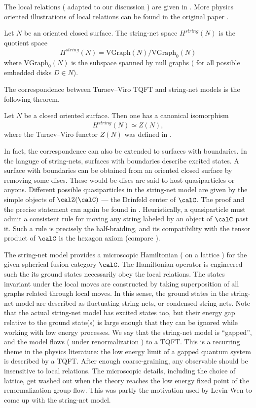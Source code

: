 The local relations ( adapted to our discussion ) are given in . More physics
oriented illustrations of local relations can be found in the original paper \cite{levin-wen}.

\begin{definition}
	Let $N$ be an oriented closed surface. The string-net space $H^{string}(N)$ is the quotient space
	\[
		H^{string}(N) = \mathrm{VGraph}(N)/\mathrm{VGraph}_0(N)
	\]
	where $\mathrm{VGraph}_0(N)$ is the subspace spanned by null graphs ( for all possible embedded 
	disks $D \in N$).
\end{definition}

The correspondence between Turaev--Viro TQFT and string-net models is the 
following theorem.

\begin{theorem}\label{t:tv-equals-stringnet}
	Let $N$ be a closed oriented surface. Then one has a canonical isomorphism
	\[
		H^{string}(N) \simeq Z(N),
	\]
	where the Turaev--Viro functor $Z(N)$ was defined in .
\end{theorem}

In fact, the correspondence can also be extended to surfaces with boundaries. 
In the languge of string-nets, surfaces with boundaries describe excited states. 
A surface with boundaries can be obtained from an oriented closed surface
by removing some discs. These would-be-discs are said to host quasiparticles 
or anyons. Different possible quasiparticles in the string-net model are given 
by the simple objects of $\calZ(\calC)$ --- the Drinfeld center of $\calC$. 
The proof and the precise statement can again be found in \cite{kirillov-stringnet}.
Heuristically, a quasiparticle must admit a consistent rule for moving any string labeled
by an object of $\calC$ past it. Such a rule is precisely the half-braiding, and its
compatibility with the tensor product of $\calC$ is the hexagon axiom 
(compare ).

The string-net model provides a microscopic Hamiltonian ( on a lattice ) for the given
spherical fusion category $\calC$. The 
Hamiltonian operator is engineered such the its
ground states necessarily obey the local relations. The states invariant under
the local moves are constructed by taking superposition of all graphs
related through local moves. In this sense, the ground states in the string-net model are
described as fluctuating string-nets, or condensed string-nets. Note that the actual 
string-net model has excited states too, but their energy gap relative to the
ground state(s) is large enough that they can be ignored while working with low
energy processes. We say that the string-net model is ``gapped'', and the model
flows ( under renormalization ) to a TQFT.
This is a recurring theme in the physics literature: the low energy
limit of a gapped quantum system is described by a TQFT. After enough coarse-graining,
any observable should be insensitive to local relations. The microscopic details,
including the choice of lattice, get washed out when the theory reaches the low energy 
fixed point of the renormalization group flow. This was partly the motivation used by Levin-Wen 
to come up with the string-net model.



